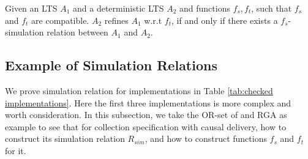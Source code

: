 
\begin{theorem}
\label{theorem:equivalence of our simulation and refinement}
Given an LTS $A_1$ and a deterministic LTS $A_2$ and functions $f_s,f_t$, such that $f_s$ and $f_t$ are compatible. $A_2$ refines $A_1$ w.r.t $f_t$, if and only if there exists a $f_s$-simulation relation between $A_1$ and $A_2$.
\end{theorem}



\subsection{Example of Simulation Relations}
\label{subsec:collection specification with calusal delivery}

{\color {red}We prove simulation relation for implementations in Table \ref{tab:checked implementations}. Here the first three implementations is more complex and worth consideration. In this subsection, we take the OR-set of \cite{Shapiro:2011} and RGA as example to see that for collection specification with causal delivery, how to construct its simulation relation $R_{\mathit{sim}}$, and how to construct functions $f_s$ and $f_t$ for it.}

